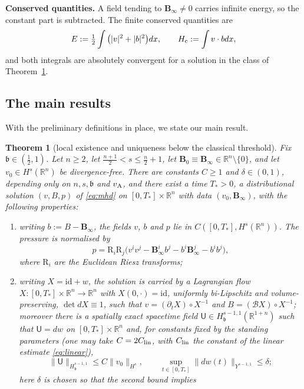 \documentclass[11pt,reqno]{amsart}
\theoremstyle{plain}
\newtheorem{theorem}{Theorem}[section]
\theoremstyle{definition}
\theoremstyle{remark}
\numberwithin{equation}{section}
\newcommand{\breg}{\mathfrak b}
\newcommand{\Ufield}{\mathsf U}
\newcommand{\Bzero}{\mathbf B_0}
\newcommand{\Binf}{\mathbf B_\infty}
\newcommand{\Real}{\mathbb R}
\newcommand{\Rn}{\Real^n}
\newcommand{\Rst}{\Real^{1+n}}
\newcommand{\Riesz}{\mathrm R}
\begin{document}
\textbf{Conserved quantities.} A field tending to $\Binf\ne0$ carries infinite energy, so the constant part is subtracted. The finite conserved quantities are
\begin{equation}\label{eq:energy}
E:=\tfrac12\int\big(|v|^2+|b|^2\big) dx,\qquad
H_{\rm c}:=\int v \cdot b dx,
\end{equation}
and both integrals are absolutely convergent for a solution in the class of
Theorem~\ref{thm:main}.

\subsection{The main results}
With the preliminary definitions in place, we state our main result. 

\begin{theorem}[local existence and uniqueness below the classical threshold]\label{thm:main}
Fix $\breg\in(\frac12,1)$. Let $n\ge2$, let $\frac{n+1}2<s\le\frac n2+1$, let
$\Bzero\equiv\Binf\in\Rn\setminus\{0\}$, and let $v_0\in H^{s}(\Rn)$ be divergence-free. There are
constants $C\ge1$ and $\delta\in(0,1)$, depending only on
$n,s,\breg$ and $v_{\rm A}$, and there exist a time $T_*>0$, a distributional
solution $(v,B, p)$ of \eqref{eq:mhd} on $[0,T_*]\times\Rn$ with data
$(v_0,\Binf)$, with the following properties:
\begin{enumerate}
\item writing $b:=B-\Binf$, the fields $v$, $b$ and $p$ lie in
$C([0,T_*],H^{s}(\Rn))$. The pressure is normalised by
\[
 p=\Riesz_i\Riesz_j
 \big(v^iv^j-\Binf^ib^j-b^i\Binf^j-b^ib^j\big),
\]
where $\Riesz_i$ are the Euclidean Riesz transforms;
\item writing $X=\mathrm{id}+w$, the solution is carried by a Lagrangian flow
$X:[0,T_*]\times\Rn\to\Rn$ with $X(0,\cdot)=\mathrm{id}$, uniformly bi-Lipschitz
and volume-preserving, $\det dX\equiv1$, such that $v=(\partial_tX)\circ X^{-1}$ and
$B=(\mathcal BX)\circ X^{-1}$;
moreover there is a spatially exact spacetime field
$\Ufield\in H^{s-1,1}_{\breg}(\Rst)$ such that
$\Ufield=dw$ on $[0,T_*]\times\Rn$ and, for constants fixed by
the standing parameters (one may take $C=2C_{\rm lin}$, with $C_{\rm lin}$
the constant of the linear estimate \eqref{eq:linear}),
\begin{equation}\label{eq:main-adapted-bound}
 \|\Ufield\|_{H^{s-1,1}_{\breg}}
 \le C\|v_0\|_{H^s},
 \qquad
 \sup_{t\in[0,T_*]}\|dw(t)\|_{Y^{s-1,1}}\le\delta;
\end{equation}
here $\delta$ is chosen so that the second bound implies

\end{enumerate}
\end{theorem}
\end{document}
